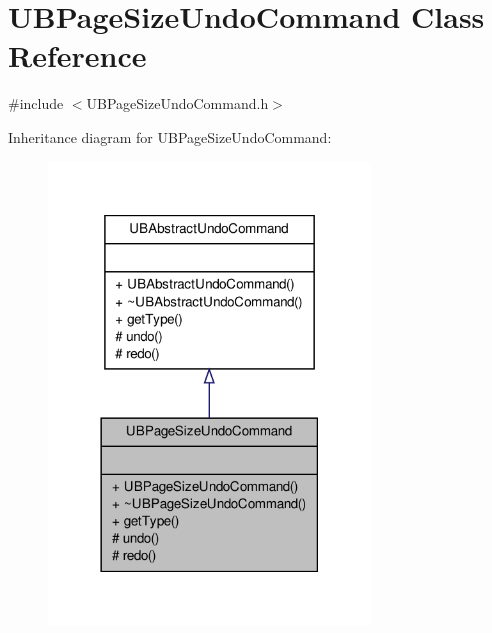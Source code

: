 \hypertarget{class_u_b_page_size_undo_command}{\section{U\-B\-Page\-Size\-Undo\-Command Class Reference}
\label{df/d58/class_u_b_page_size_undo_command}
}


{\ttfamily \#include $<$U\-B\-Page\-Size\-Undo\-Command.\-h$>$}



Inheritance diagram for U\-B\-Page\-Size\-Undo\-Command\-:
\nopagebreak
\begin{figure}[H]
\begin{center}
\leavevmode
\includegraphics[width=242pt]{da/d7d/class_u_b_page_size_undo_command__inherit__graph}
\end{center}
\end{figure}


